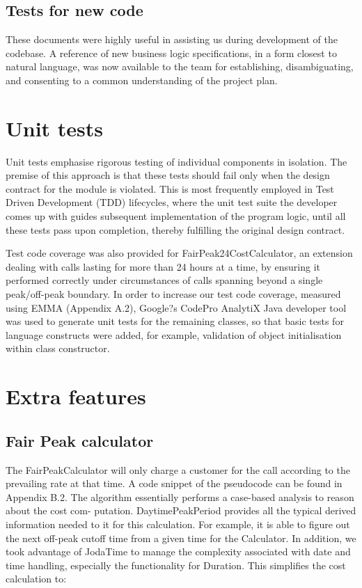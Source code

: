 \documentclass[11pt,twocolumn]{article} %
\begin{document}
\subsection{Tests for new code}
These documents were highly useful in assisting us during development of the codebase.
A reference of new business logic specifications, in a form closest to natural language, was now available to the team for establishing, disambiguating, and consenting to a common understanding of the project plan.

\section{Unit tests}
Unit tests emphasise rigorous testing of individual components in isolation. The premise
of this approach is that these tests should fail only when the design contract for the module
is violated.
This is most frequently employed in Test Driven Development (TDD) lifecycles, where
the unit test suite the developer comes up with guides subsequent implementation of the
program logic, until all these tests pass upon completion, thereby fulfilling the original
design contract.

Test code coverage was also provided for FairPeak24CostCalculator, an extension dealing
with calls lasting for more than 24 hours at a time, by ensuring it performed correctly
under circumstances of calls spanning beyond a single peak/off-peak boundary.
In order to increase our test code coverage, measured using EMMA (Appendix A.2),
Google?s CodePro AnalytiX Java developer tool was used to generate unit tests for the
remaining classes, so that basic tests for language constructs were added, for example,
validation of object initialisation within class constructor.



\section{Extra features}

\subsection{Fair Peak calculator}
The FairPeakCalculator will only charge a customer for the call according to the prevailing
rate at that time. A code snippet of the pseudocode can be found in Appendix B.2.
The algorithm essentially performs a case-based analysis to reason about the cost com-
putation. DaytimePeakPeriod provides all the typical derived information needed to it for
this calculation. For example, it is able to figure out the next off-peak cutoff time from a
given time for the Calculator.
In addition, we took advantage of JodaTime to manage the complexity associated with
date and time handling, especially the functionality for Duration. This simplifies the cost calculation to:
\end{document}
